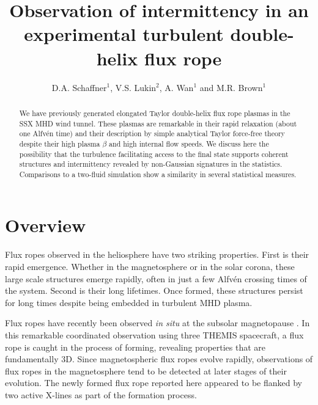 \documentclass[12pt]{iopart}
\begin{document}
\title{Observation of intermittency in an experimental turbulent double-helix flux rope}

\author{D.A. Schaffner$^{1}$, V.S. Lukin$^{2}$, A. Wan$^{1}$ and M.R. Brown$^{1}$}

\address{$^{1}$ Swarthmore College, Swarthmore, PA, USA}
\address{$^{2}$ Naval Research Laboratory, Washington, DC, USA}
\begin{abstract}
We have previously generated elongated Taylor double-helix flux rope plasmas in the SSX MHD wind tunnel.  These plasmas are remarkable in their rapid relaxation (about one Alfv\'en time) and their description by simple analytical Taylor force-free theory despite their high plasma $\beta$ and high internal flow speeds.  We discuss here the possibility that the turbulence facilitating access to the final state supports coherent structures and intermittency revealed by non-Gaussian signatures in the statistics.  Comparisons to a two-fluid simulation show a similarity in several statistical measures.
\end{abstract}

\submitto{\PPCF}
\maketitle

\section{Overview}
Flux ropes observed in the heliosphere have two striking properties.   First is their rapid emergence.  Whether in the magnetosphere or in the solar corona, these large scale structures emerge rapidly, often in just a few Alfv\'en crossing times of the system.  Second is their long lifetimes.  Once formed, these structures persist for long times despite being embedded in turbulent MHD plasma.  

Flux ropes have recently been observed {\it in situ} at the subsolar magnetopause \cite{Oieroset11}.  In this remarkable coordinated observation using three THEMIS spacecraft, a flux rope is caught in the process of forming, revealing properties that are fundamentally 3D. Since magnetospheric flux ropes evolve rapidly, observations of flux ropes in the magnetosphere tend to be detected at later stages of their evolution.  The newly formed flux rope reported here appeared to be flanked by two active X-lines as part of the formation process.
\end{document}
